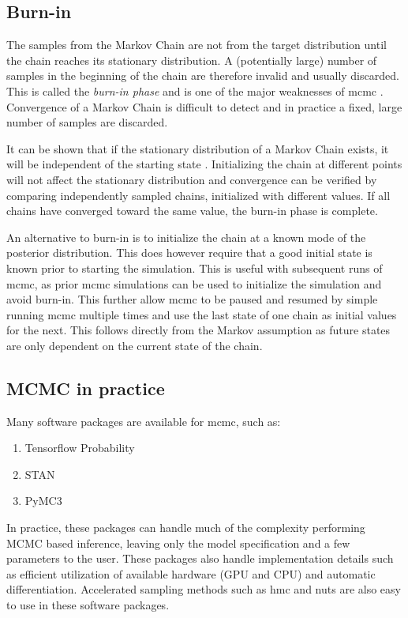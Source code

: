 \subsection{Burn-in}
The samples from the Markov Chain are not from the target distribution until the chain reaches its stationary distribution. A (potentially large) number of samples in the beginning of the chain are therefore invalid and usually discarded. This is called the \textit{burn-in phase} and is one of the major weaknesses of \acrshort{mcmc} \cite{murphy}. Convergence of a Markov Chain is difficult to detect and in practice a fixed, large number of samples are discarded.   

It can be shown that if the stationary distribution of a Markov Chain exists, it will be independent of the starting state \cite{murphy}. Initializing the chain at different points will not affect the stationary distribution and convergence can be verified by comparing independently sampled chains, initialized with different values. If all chains have converged toward the same value, the burn-in phase is complete.

An alternative to burn-in is to initialize the chain at a known mode of the posterior distribution. This does however require that a good initial state is known prior to starting the simulation. This is useful with subsequent runs of \acrshort{mcmc}, as prior \acrshort{mcmc} simulations can be used to initialize the simulation and avoid burn-in. This further allow \acrshort{mcmc} to be paused and resumed by simple running \acrshort{mcmc} multiple times and use the last state of one chain as initial values for the next. This follows directly from the Markov assumption as future states are only dependent on the current state of the chain. 

\subsection{MCMC in practice}
Many software packages are available for \acrshort{mcmc}, such as: 

\begin{enumerate}
    \item Tensorflow Probability \cite{tensorflow2015-whitepaper}
    \item STAN \cite{stan}
    \item PyMC3 \cite{pymc3}
\end{enumerate}

In practice, these packages can handle much of the complexity performing MCMC based inference, leaving only the model specification and a few parameters to the user. These packages also handle implementation details such as efficient utilization of available hardware (GPU and CPU) and automatic differentiation. Accelerated sampling methods such as \acrshort{hmc} and \acrshort{nuts} are also easy to use in these software packages.   

